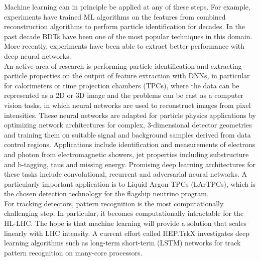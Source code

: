 
Machine learning can in principle be applied at any of these steps. For example, experiments have trained ML algorithms on the features from combined reconstruction algorithms to perform particle identification for decades. In the past decade BDTs have been one of the most popular techniques in this domain. More recently, experiments have been able to extract better performance with deep neural networks.\\

An active area of research is performing particle identification and extracting particle properties on the output of feature extraction with DNNs, in particular for calorimeters or time projection chambers (TPCs), where the data can be represented as a 2D or 3D image and the problems can be cast as a computer vision tasks, in which neural networks are used to reconstruct images from pixel intensities. These neural networks are adapted for particle physics applications by optimizing network architectures for complex, 3-dimensional detector geometries and training them on suitable signal and background samples derived from data control regions. Applications include identification and measurements of electrons and photon from electromagnetic showers, jet properties including substructure and b-tagging, taus and missing energy. Promising deep learning architectures for these tasks include convolutional, recurrent and adversarial neural networks. A particularly important application is to Liquid Argon TPCs (LArTPCs), which is the chosen detection technology for the flagship neutrino program.\\ %

For tracking detectors, pattern recognition is the most computationally challenging step. In particular, it becomes computationally intractable for the HL-LHC. The hope is that machine learning will provide a solution that scales linearly with LHC intensity. A current effort called HEP.TrkX investigates deep learning algorithms such as long-term short-term (LSTM) networks for track pattern recognition on many-core processors.

